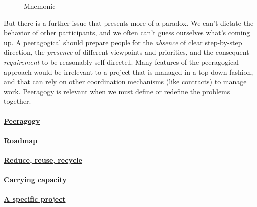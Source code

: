 \begin{refsection}
\begin{wrapfigure}{l}{.52\textwidth}
\vspace{-2.8cm}
\hspace{-.15cm}\resizebox{.55\textwidth}{!}{

}
\hspace{.4cm}
\vspace{-2.95cm}
\caption{Mnemonic \label{mnemonic}}
\vspace{-.6cm}
\end{wrapfigure}

But there is a further issue that presents more of a paradox.  We
can't dictate the behavior of other participants, and we often can't
guess ourselves what's coming up.  A peeragogical
 should prepare people for the \emph{absence} of
clear step-by-step direction, the \emph{presence} of different
viewpoints and priorities, and the consequent \emph{requirement} to be
reasonably self-directed.  Many features of the peeragogical approach
would be irrelevant to a project that is managed in a top-down
fashion, and that can rely on other coordination mechanisms (like
contracts) to manage work.  Peeragogy is relevant when we must define
or redefine the problems together.


\paragraph{\hyperref[sec:Peeragogy]{Peeragogy}} 
\PeeragogyWN

\paragraph{\hyperref[sec:Roadmap]{Roadmap}} 
\RoadmapWN

\paragraph{\hyperref[sec:Reduce, reuse, recycle]{Reduce, reuse, recycle}}
\ReduceWN

\paragraph{\hyperref[sec:Carrying capacity]{Carrying capacity}} 
\CarryingWN

\paragraph{\hyperref[sec:A specific project]{A specific project}}
\SpecificWN


\end{refsection}
